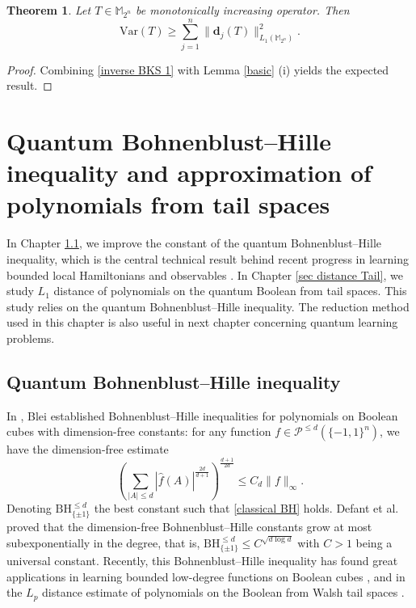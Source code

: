 \documentclass{amsbook}
\newtheorem{theorem}{Theorem}[chapter]
\theoremstyle{definition}
\theoremstyle{remark}
\numberwithin{section}{chapter}
\numberwithin{equation}{chapter}
\newcommand{\1}{\mathbf{1}}
\newcommand{\dc}{\mathbf{d}}
\begin{document}
\begin{theorem}\label{Var-low-1} Let $T\in\mathbb{M}_{2^n}$ be monotonically increasing operator. Then 
	$$\mathrm{Var}(T)\geq\sum_{j=1}^n\|\dc_j(T)\|_{L_1(\mathbb{M}_{2^n})}^2.$$
\end{theorem}
\begin{proof} Combining \eqref{inverse BKS 1} with Lemma \ref{basic} (i) yields the expected result.
\end{proof}



\chapter[Quantum BH Inequality and Approximation]{Quantum Bohnenblust--Hille inequality and approximation of polynomials from tail spaces }\label{sec BH distance}
In Chapter \ref{sec BH}, we improve the constant of the quantum Bohnenblust--Hille inequality, which is the central technical result behind recent progress in learning bounded local Hamiltonians and observables \cite{HCP2023,VZ2024}. In Chapter \ref{sec distance Tail}, we study $L_1$ distance of polynomials on the quantum Boolean from tail spaces. This study relies on the quantum Bohnenblust--Hille inequality. The reduction method used in this chapter is also useful in next chapter concerning quantum learning problems.


\section{Quantum Bohnenblust--Hille inequality}\label{sec BH}
In \cite{Bl2001}, Blei established Bohnenblust--Hille inequalities for polynomials on Boolean cubes with dimension-free constants:
for any function $f \in \mathcal{P}^{\leq d}(\{-1,1\}^n)$, we have the dimension-free estimate
\begin{equation}\label{classical BH}
\left( \sum_{|A|\leq d} |\widehat{f}(A)|^{\frac{2d}{d+1}} \right)^{\frac{d+1}{2d}} \leq  C_d\|f\|_\infty.
\end{equation}
Denoting $\mathrm{BH}_{\{\pm1\}}^{\leq d} $  the best constant such that \eqref{classical BH} holds.  Defant et al. \cite{DMP2019} proved that the dimension-free Bohnenblust--Hille constants grow at most subexponentially in the degree, that is, $\mathrm{BH}_{\{\pm1\}}^{\leq d} \leq C^{\sqrt{d \log d}}$ with $C > 1$ being a universal constant. Recently, this
Bohnenblust--Hille inequality  has found great applications in
learning bounded low-degree functions on Boolean cubes \cite{EI2022}, and in the $L_p$ distance estimate of polynomials on the Boolean from
Walsh tail spaces \cite{EZ2024}. 
\end{document}
